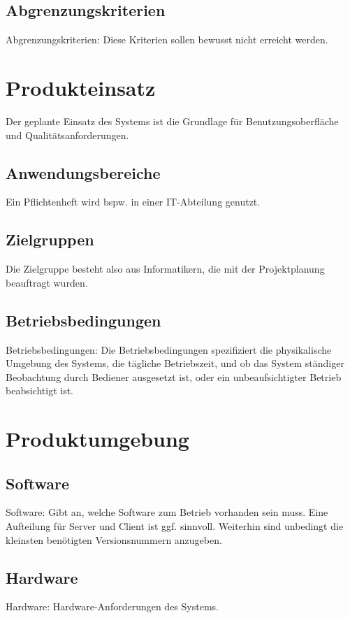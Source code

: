 \documentclass[a4paper]{scrreprt}
\begin{document}
        \section{Abgrenzungskriterien}
            Abgrenzungskriterien: Diese Kriterien sollen bewusst nicht erreicht werden.
 
    \chapter{Produkteinsatz}
        Der geplante Einsatz des Systems ist die Grundlage für Benutzungsoberfläche und
        Qualitätsanforderungen.
 
        \section{Anwendungsbereiche}
            Ein Pflichtenheft wird bspw. in einer IT-Abteilung genutzt.
 
        \section{Zielgruppen}
            Die Zielgruppe besteht also aus Informatikern, die mit der Projektplanung
            beauftragt wurden.
 
        \section{Betriebsbedingungen}
            Betriebsbedingungen: Die Betriebsbedingungen spezifiziert die physikalische
            Umgebung des Systems, die tägliche Betriebszeit, und ob das System ständiger
            Beobachtung durch Bediener ausgesetzt ist, oder ein unbeaufsichtigter Betrieb
            beabsichtigt ist.
 
    \chapter{Produktumgebung}
 
        \section{Software}
            Software: Gibt an, welche Software zum Betrieb vorhanden sein muss. Eine
            Aufteilung für Server und Client ist ggf. sinnvoll. Weiterhin sind unbedingt die
            kleinsten benötigten Versionsnummern anzugeben.
 
        \section{Hardware}
            Hardware: Hardware-Anforderungen des Systems.
 
\end{document}
